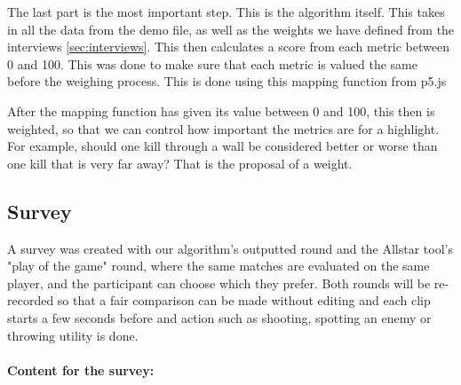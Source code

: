 The last part is the most important step. This is the algorithm itself. This takes in all the data from the demo file, as well as the weights we have defined from the interviews \ref{sec:interviews}. This then calculates a score from each metric between 0 and 100. This was done to make sure that each metric is valued the same before the weighing process. This is done using this mapping function from p5.js\cite{p5jsMap}

After the mapping function has given its value between 0 and 100, this then is weighted, so that we can control how important the metrics are for a highlight. For example, should one kill through a wall be considered better or worse than one kill that is very far away? That is the proposal of a weight. 

\subsection{Survey}
\label{sec:survey}
A survey was created with our algorithm's outputted round and the Allstar tool's "play of the game" round, where the same matches are evaluated on the same player, and the participant can choose which they prefer. Both rounds will be re-recorded so that a fair comparison can be made without editing and each clip starts a few seconds before and action such as shooting, spotting an enemy or throwing utility is done.\\\\
\textbf {Content for the survey:}
